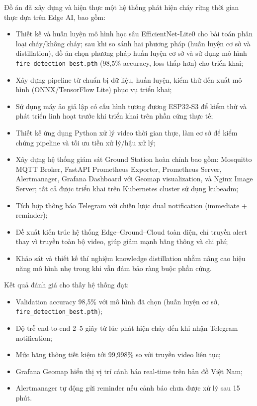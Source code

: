 \documentclass[12pt,a4paper]{report}
\begin{document}
Đồ án đã xây dựng và hiện thực một hệ thống phát hiện cháy rừng thời gian thực dựa trên Edge AI, bao gồm:
\begin{itemize}
  \item Thiết kế và huấn luyện mô hình học sâu EfficientNet-Lite0 cho bài toán phân loại cháy/không cháy; sau khi so sánh hai phương pháp (huấn luyện cơ sở và distillation), đồ án chọn phương pháp huấn luyện cơ sở và sử dụng mô hình \texttt{fire\_detection\_best.pth} (98{,}5\% accuracy, loss thấp hơn) cho triển khai;
  \item Xây dựng pipeline từ chuẩn bị dữ liệu, huấn luyện, kiểm thử đến xuất mô hình (ONNX/TensorFlow Lite) phục vụ triển khai;
  \item Sử dụng máy ảo giả lập có cấu hình tương đương ESP32-S3 để kiểm thử và phát triển linh hoạt trước khi triển khai trên phần cứng thực tế;
  \item Thiết kế ứng dụng Python xử lý video thời gian thực, làm cơ sở để kiểm chứng pipeline và tối ưu tiền xử lý/hậu xử lý;
  \item Xây dựng hệ thống giám sát Ground Station hoàn chỉnh bao gồm: Mosquitto MQTT Broker, FastAPI Prometheus Exporter, Prometheus Server, Alertmanager, Grafana Dashboard với Geomap visualization, và Nginx Image Server; tất cả được triển khai trên Kubernetes cluster sử dụng kubeadm;
  \item Tích hợp thông báo Telegram với chiến lược dual notification (immediate + reminder);
  \item Đề xuất kiến trúc hệ thống Edge--Ground--Cloud toàn diện, chỉ truyền alert thay vì truyền toàn bộ video, giúp giảm mạnh băng thông và chi phí;
  \item Khảo sát và thiết kế thí nghiệm knowledge distillation nhằm nâng cao hiệu năng mô hình nhẹ trong khi vẫn đảm bảo ràng buộc phần cứng.
\end{itemize}

Kết quả đánh giá cho thấy hệ thống đạt:
\begin{itemize}
  \item Validation accuracy 98{,}5\% với mô hình đã chọn (huấn luyện cơ sở, \texttt{fire\_detection\_best.pth});
  \item Độ trễ end-to-end 2--5 giây từ lúc phát hiện cháy đến khi nhận Telegram notification;
  \item Mức băng thông tiết kiệm tới 99{,}998\% so với truyền video liên tục;
  \item Grafana Geomap hiển thị vị trí cảnh báo real-time trên bản đồ Việt Nam;
  \item Alertmanager tự động gửi reminder nếu cảnh báo chưa được xử lý sau 15 phút.
\end{itemize}
\end{document}
